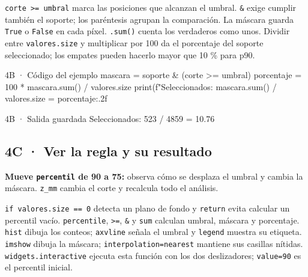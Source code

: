 \texttt{\small corte >= umbral} marca las posiciones que alcanzan el umbral. \texttt{\small \&} exige cumplir también el soporte; los paréntesis agrupan la comparación. La máscara guarda \texttt{\small True} o \texttt{\small False} en cada píxel. \texttt{\small .\allowbreak{}sum(\allowbreak{})\allowbreak{}} cuenta los verdaderos como unos. Dividir entre \texttt{\small valores.\allowbreak{}size} y multiplicar por 100 da el porcentaje del soporte seleccionado; los empates pueden hacerlo mayor que 10 \% para p90.

\begin{CodigoVivo}{4B · Código del ejemplo}
mascara = soporte & (corte >= umbral)
porcentaje = 100 * mascara.sum() / valores.size
print(f"Seleccionados: {mascara.sum()} / {valores.size} = {porcentaje:.2f}%
\end{CodigoVivo}


\begin{Salida}{4B · Salida guardada}
Seleccionados: 523 / 4859 = 10.76%
\end{Salida}



\subsection*{4C · Ver la regla y su resultado}

\label{vivo:4c}

\textbf{Mueve \texttt{\small percentil} de 90 a 75:} observa cómo se desplaza el umbral y cambia la máscara. \texttt{\small z\_mm} cambia el corte y recalcula todo el análisis.

\texttt{\small if valores.\allowbreak{}size == 0} detecta un plano de fondo y \texttt{\small return} evita calcular un percentil vacío. \texttt{\small percentile}, \texttt{\small >=}, \texttt{\small \&} y \texttt{\small sum} calculan umbral, máscara y porcentaje. \texttt{\small hist} dibuja los conteos; \texttt{\small axvline} señala el umbral y \texttt{\small legend} muestra su etiqueta. \texttt{\small imshow} dibuja la máscara; \texttt{\small interpolation=\textquotedbl{}nearest\textquotedbl{}} mantiene sus casillas nítidas. \texttt{\small widgets.\allowbreak{}interactive} ejecuta esta función con los dos deslizadores; \texttt{\small value=90} es el percentil inicial.

